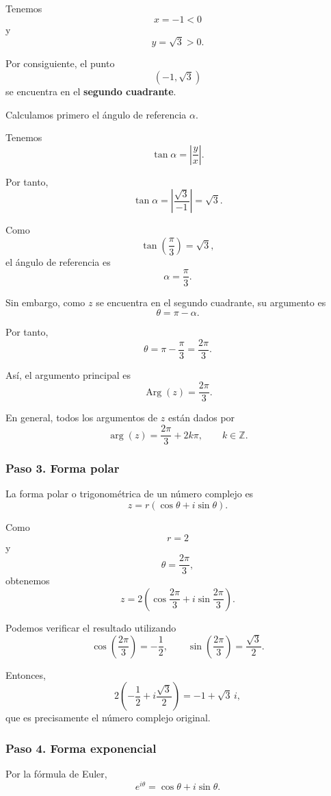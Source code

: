 Tenemos
\[
x=-1<0
\]
y
\[
y=\sqrt{3}>0.
\]

Por consiguiente, el punto
\[
(-1,\sqrt{3})
\]
se encuentra en el \textbf{segundo cuadrante}.

Calculamos primero el ángulo de referencia $\alpha$.

Tenemos
\[
\tan\alpha
=
\left|
\frac{y}{x}
\right|.
\]

Por tanto,
\[
\tan\alpha
=
\left|
\frac{\sqrt{3}}{-1}
\right|
=
\sqrt{3}.
\]

Como
\[
\tan\left(\frac{\pi}{3}\right)
=
\sqrt{3},
\]
el ángulo de referencia es
\[
\alpha
=
\frac{\pi}{3}.
\]

Sin embargo, como $z$ se encuentra en el segundo cuadrante,
su argumento es
\[
\theta
=
\pi-\alpha.
\]

Por tanto,
\[
\theta
=
\pi-\frac{\pi}{3}
=
\frac{2\pi}{3}.
\]

Así, el argumento principal es
\[
\boxed{
\operatorname{Arg}(z)
=
\frac{2\pi}{3}
}.
\]

En general, todos los argumentos de $z$ están dados por
\[
\boxed{
\arg(z)
=
\frac{2\pi}{3}+2k\pi,
\qquad
k\in\mathbb{Z}
}.
\]

\subsubsection*{Paso 3. Forma polar}

La forma polar o trigonométrica de un número complejo es
\[
z
=
r(\cos\theta+i\sin\theta).
\]

Como
\[
r=2
\]
y
\[
\theta=\frac{2\pi}{3},
\]
obtenemos
\[
\boxed{
z
=
2\left(
\cos\frac{2\pi}{3}
+
i\sin\frac{2\pi}{3}
\right)
}.
\]

Podemos verificar el resultado utilizando
\[
\cos\left(\frac{2\pi}{3}\right)
=
-\frac{1}{2},
\qquad
\sin\left(\frac{2\pi}{3}\right)
=
\frac{\sqrt{3}}{2}.
\]

Entonces,
\[
2\left(
-\frac{1}{2}
+
i\frac{\sqrt{3}}{2}
\right)
=
-1+\sqrt{3}\,i,
\]
que es precisamente el número complejo original.

\subsubsection*{Paso 4. Forma exponencial}

Por la fórmula de Euler,
\[
e^{i\theta}
=
\cos\theta+i\sin\theta.
\]

